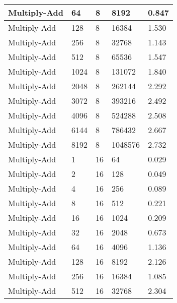 \documentclass{article}
\begin{document}
\begin{longtable}{|l|l|l|l|l|}
Multiply-Add       & 64   & 8           & 8192              & 0.847             \\ \hline
Multiply-Add       & 128  & 8           & 16384             & 1.530             \\ \hline
Multiply-Add       & 256  & 8           & 32768             & 1.143             \\ \hline
Multiply-Add       & 512  & 8           & 65536             & 1.547             \\ \hline
Multiply-Add       & 1024 & 8           & 131072            & 1.840             \\ \hline
Multiply-Add       & 2048 & 8           & 262144            & 2.292             \\ \hline
Multiply-Add       & 3072 & 8           & 393216            & 2.492             \\ \hline
Multiply-Add       & 4096 & 8           & 524288            & 2.508             \\ \hline
Multiply-Add       & 6144 & 8           & 786432            & 2.667             \\ \hline
Multiply-Add       & 8192 & 8           & 1048576           & 2.732             \\ \hline
Multiply-Add       & 1    & 16          & 64                & 0.029             \\ \hline
Multiply-Add       & 2    & 16          & 128               & 0.049             \\ \hline
Multiply-Add       & 4    & 16          & 256               & 0.089             \\ \hline
Multiply-Add       & 8    & 16          & 512               & 0.221             \\ \hline
Multiply-Add       & 16   & 16          & 1024              & 0.209             \\ \hline
Multiply-Add       & 32   & 16          & 2048              & 0.673             \\ \hline
Multiply-Add       & 64   & 16          & 4096              & 1.136             \\ \hline
Multiply-Add       & 128  & 16          & 8192              & 2.126             \\ \hline
Multiply-Add       & 256  & 16          & 16384             & 1.085             \\ \hline
Multiply-Add       & 512  & 16          & 32768             & 2.304             \\ \hline

\end{longtable}
\end{document}
